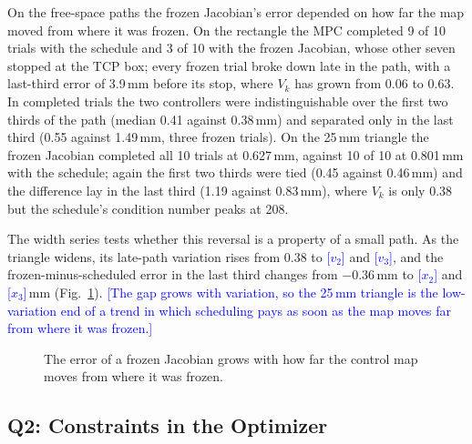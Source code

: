 \documentclass[journal]{IEEEtran}
\newcommand{\NEWRUN}[1]{\textcolor{blue}{[#1]}}
\newcommand{\figph}[3]{%
  \fbox{\parbox[c][#2][c]{\dimexpr#1-2\fboxsep-2\fboxrule\relax}{%
  \centering\footnotesize\textcolor{gray}{\textbf{Figure placeholder}}\\[2pt]
  \parbox{0.9\linewidth}{\centering\footnotesize\textcolor{gray}{#3}}}}}
\begin{document}
On the free-space paths the frozen Jacobian's error depended on how far
the map moved from where it was frozen. On the rectangle the MPC
completed 9 of 10 trials with the schedule and 3 of 10 with the frozen
Jacobian, whose other seven stopped at the TCP box; every frozen trial broke
down late in the path, with a last-third error of 3.9\,mm before its stop,
where $V_k$ has grown from 0.06 to 0.63. In completed trials the two
controllers were indistinguishable over the first two thirds of the path
(median 0.41 against 0.38\,mm) and separated only in the last third (0.55
against 1.49\,mm, three frozen trials). On the 25\,mm triangle the frozen
Jacobian completed all 10 trials at 0.627\,mm, against 10 of 10 at
0.801\,mm with the schedule; again the first two thirds were tied (0.45
against 0.46\,mm) and the difference lay in the last third (1.19 against
0.83\,mm), where $V_k$ is only 0.38 but the schedule's condition number
peaks at 208.

The width series tests whether this reversal is a property of a small
path. As the triangle widens, its late-path variation rises from 0.38 to
\NEWRUN{$v_2$} and \NEWRUN{$v_3$}, and the frozen-minus-scheduled error in
the last third changes from $-0.36$\,mm to \NEWRUN{$x_2$} and
\NEWRUN{$x_3$}\,mm (Fig.~\ref{fig:variation}). \NEWRUN{The gap grows with
variation, so the 25\,mm triangle is the low-variation end of a trend in
which scheduling pays as soon as the map moves far from where it was
frozen.}

\begin{figure}[t]
\centering
\figph{\columnwidth}{4.4cm}{(a) $V_k$ versus normalized path progress for
the rectangle, the three triangles and the vessel, last third shaded.
(b) Last-third error of the frozen minus the scheduled Jacobian (median
and range over trials) versus last-third $V_k$, one point per path; the
25\,mm triangle is the leftmost point.}
\caption{The error of a frozen Jacobian grows with how far the control
map moves from where it was frozen.}
\label{fig:variation}
\end{figure}

\subsection{Q2: Constraints in the Optimizer}
\label{sec:res-con}
\end{document}
